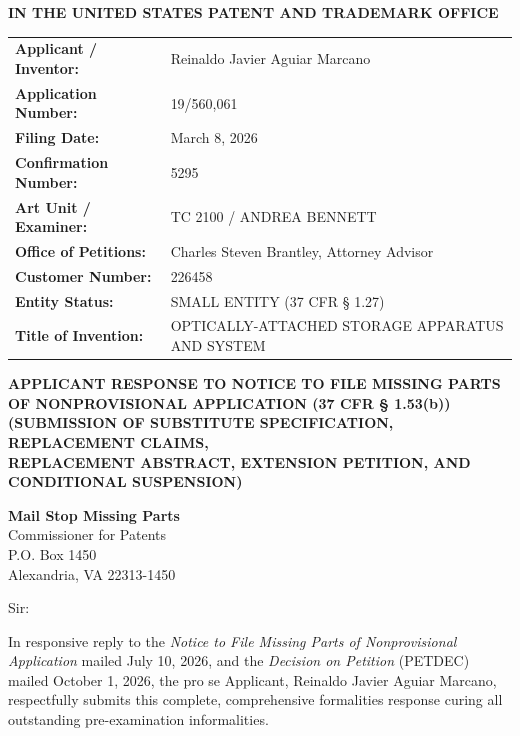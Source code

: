 \documentclass[11pt,letterpaper]{article}
\begin{document}
\thispagestyle{empty}

\begin{center}
    \textbf{\large IN THE UNITED STATES PATENT AND TRADEMARK OFFICE}
\end{center}

\vspace{0.3cm}
\noindent\begin{tabular}{p{2.3in}p{4.0in}}
\textbf{Applicant / Inventor:} & Reinaldo Javier Aguiar Marcano \\
\textbf{Application Number:} & 19/560,061 \\
\textbf{Filing Date:} & March 8, 2026 \\
\textbf{Confirmation Number:} & 5295 \\
\textbf{Art Unit / Examiner:} & TC 2100 / ANDREA BENNETT \\
\textbf{Office of Petitions:} & Charles Steven Brantley, Attorney Advisor \\
\textbf{Customer Number:} & 226458 \\
\textbf{Entity Status:} & SMALL ENTITY (37 CFR \S{} 1.27) \\
\textbf{Title of Invention:} & OPTICALLY-ATTACHED STORAGE APPARATUS AND SYSTEM \\
\end{tabular}

\vspace{0.4cm}
\begin{center}
    \textbf{\large APPLICANT RESPONSE TO NOTICE TO FILE MISSING PARTS \\
    OF NONPROVISIONAL APPLICATION (37 CFR \S{} 1.53(b))} \\
    \textbf{\normalsize (SUBMISSION OF SUBSTITUTE SPECIFICATION, REPLACEMENT CLAIMS, \\
    REPLACEMENT ABSTRACT, EXTENSION PETITION, AND CONDITIONAL SUSPENSION)}
\end{center}

\noindent\textbf{Mail Stop Missing Parts} \\
Commissioner for Patents \\
P.O. Box 1450 \\
Alexandria, VA 22313-1450

\vspace{0.2cm}
Sir:

In responsive reply to the \textit{Notice to File Missing Parts of Nonprovisional Application} mailed July 10, 2026, and the \textit{Decision on Petition} (PETDEC) mailed October 1, 2026, the pro se Applicant, Reinaldo Javier Aguiar Marcano, respectfully submits this complete, comprehensive formalities response curing all outstanding pre-examination informalities.
\end{document}
